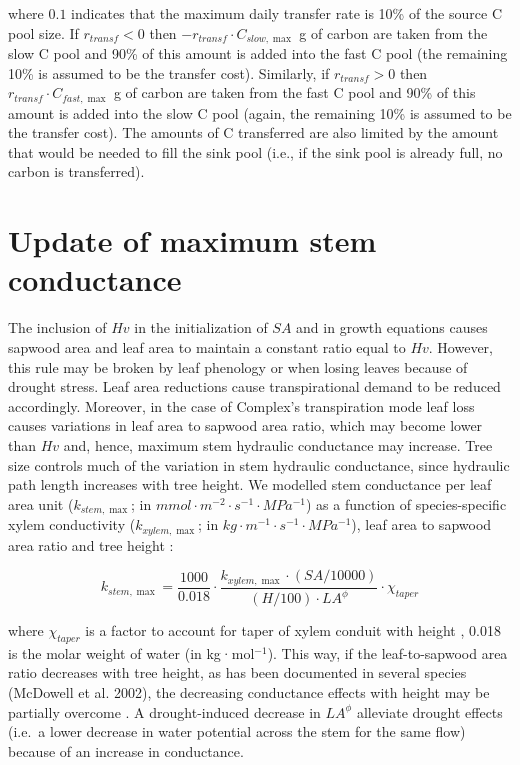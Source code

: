 \documentclass[]{book}
\begin{document}
where \(0.1\) indicates that the maximum daily transfer rate is 10\% of
the source C pool size. If \(r_{transf}<0\) then
\(-r_{transf} \cdot C_{slow, \max}\) g of carbon are taken from the slow
C pool and 90\% of this amount is added into the fast C pool (the
remaining 10\% is assumed to be the transfer cost). Similarly, if
\(r_{transf}>0\) then \(r_{transf} \cdot C_{fast, \max}\) g of carbon
are taken from the fast C pool and 90\% of this amount is added into the
slow C pool (again, the remaining 10\% is assumed to be the transfer
cost). The amounts of C transferred are also limited by the amount that
would be needed to fill the sink pool (i.e., if the sink pool is already
full, no carbon is transferred).

\section{Update of maximum stem
conductance}\label{update-of-maximum-stem-conductance}

The inclusion of \(Hv\) in the initialization of \(SA\) and in growth
equations causes sapwood area and leaf area to maintain a constant ratio
equal to \(Hv\). However, this rule may be broken by leaf phenology or
when losing leaves because of drought stress. Leaf area reductions cause
transpirational demand to be reduced accordingly. Moreover, in the case
of Complex's transpiration mode leaf loss causes variations in leaf area
to sapwood area ratio, which may become lower than \(Hv\) and, hence,
maximum stem hydraulic conductance may increase. Tree size controls much
of the variation in stem hydraulic conductance, since hydraulic path
length increases with tree height. We modelled stem conductance per leaf
area unit (\(k_{stem, \max}\); in \(mmol·m^{-2}·s^{-1}·MPa^{-1}\)) as a
function of species-specific xylem conductivity (\(k_{xylem, \max}\); in
\(kg·m^{-1}·s^{-1}·MPa^{-1}\)), leaf area to sapwood area ratio and tree
height \citep{Christoffersen2016}:

\begin{equation}
k_{stem, \max} = \frac{1000}{0.018} \cdot \frac{k_{xylem, \max} \cdot (SA/10000)}{(H/100) \cdot LA^{\phi}} \cdot \chi_{taper}
\end{equation}

where \(\chi_{taper}\) is a factor to account for taper of xylem conduit
with height \citep{Savage2010, Christoffersen2016}, 0.018 is the molar
weight of water (in kg·mol\(^{-1}\)). This way, if the leaf-to-sapwood
area ratio decreases with tree height, as has been documented in several
species (McDowell et al. 2002), the decreasing conductance effects with
height may be partially overcome \citep{Christoffersen2016}. A
drought-induced decrease in \(LA^{\phi}\) alleviate drought effects
(i.e.~a lower decrease in water potential across the stem for the same
flow) because of an increase in conductance.
\end{document}
